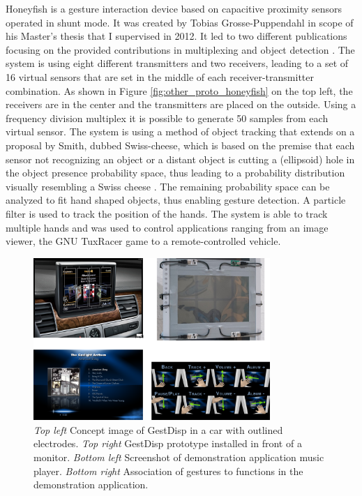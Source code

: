 Honeyfish is a gesture interaction device based on capacitive proximity sensors operated in shunt mode. It was created by Tobias Grosse-Puppendahl in scope of his Master's thesis that I supervised in 2012. It led to two different publications focusing on the provided contributions in multiplexing and object detection \cite{grosse2012honey}\cite{grosse2013swiss}. The system is using eight different transmitters and two receivers, leading to a set of 16 virtual sensors that are set in the middle of each receiver-transmitter combination. As shown in Figure \ref{fig:other_proto_honeyfish} on the top left, the receivers are in the center and the transmitters are placed on the outside. Using a frequency division multiplex it is possible to generate 50 samples from each virtual sensor. The system is using a method of object tracking that extends on a proposal by Smith, dubbed Swiss-cheese, which is based on the premise that each sensor not recognizing an object or a distant object is cutting a (ellipsoid) hole in the object presence probability space, thus leading to a probability distribution visually resembling a Swiss cheese \cite{Smith1996a}. The remaining probability space can be analyzed to fit hand shaped objects, thus enabling gesture detection. A particle filter is used to track the position of the hands. The system is able to track multiple hands and was used to control applications ranging from an image viewer, the GNU TuxRacer game to a remote-controlled vehicle.
\begin{figure}[ht]
\centering
\includegraphics[width=0.8\textwidth]{images/other_proto_gestdisp}
\caption{\emph{Top left} Concept image of GestDisp in a car with outlined electrodes. \emph{Top right} GestDisp prototype installed in front of a monitor. \emph{Bottom left} Screenshot of demonstration application music player. \emph{Bottom right} Association of gestures to functions in the demonstration application.}
\label{fig:other_proto_gestdisp}
\end{figure}

